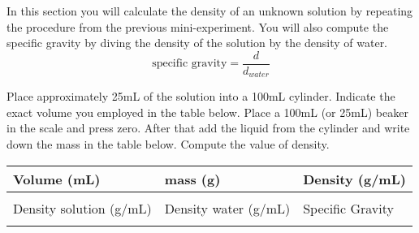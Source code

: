 \documentclass[main.tex]{subfiles}
\begin{document}
\begin{fullwidth}
\vspace{0.2cm}{\large \bfseries 2. Density of a solution}
In this section you will calculate the density of an unknown solution by repeating the procedure from the previous mini-experiment. You will also compute the specific gravity by diving the density of the solution by the density of water.
\begin{equation*}
\text{specific gravity}=\frac{d}{d_{water}}
\end{equation*}

\begin{steps}
    \newstep[] Place approximately 25mL of the solution into a 100mL cylinder. Indicate the exact volume you employed in the table below.    
    \newstep[] Place a 100mL (or 25mL) beaker in the scale and press zero. After that add the liquid from the cylinder and write down the mass in the table below.
     \newstep[] Compute the value of density.
\end{steps}
\begin{center}\begin{tabular}{ |p{4cm}|p{4cm}|p{4cm}|  }
\hline
    Volume (mL) &  mass (g) &  Density  (g/mL)         \\
\hline
   \vspace{0cm}\vspace{.5cm} &     &            \\
\hline
    Density  solution (g/mL)  &  Density  water (g/mL) &  Specific Gravity      \\
\hline
   \vspace{0cm}\vspace{.5cm} &     &            \\
\hline
\end{tabular}\end{center}

\end{fullwidth}
\end{document}
